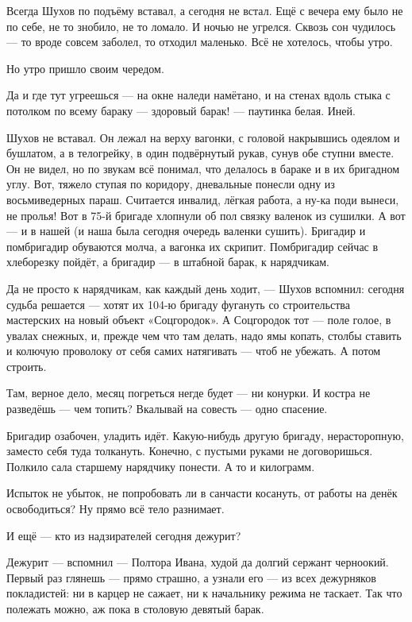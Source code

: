 Всегда Шухов по подъёму вставал, а сегодня не встал. Ещё с вечера ему было не по себе, не то
знобило, не то ломало. И ночью не угрелся. Сквозь сон чудилось --- то вроде совсем заболел, то
отходил маленько. Всё не хотелось, чтобы утро.

Но утро пришло своим чередом.

Да и где тут угреешься --- на окне наледи намётано, и на стенах вдоль стыка с потолком по всему
бараку --- здоровый барак! --- паутинка белая. Иней.

Шухов не вставал. Он лежал на верху вагонки, с головой накрывшись одеялом и бушлатом, а в
телогрейку, в один подвёрнутый рукав, сунув обе ступни вместе. Он не видел, но по звукам всё
понимал, что делалось в бараке и в их бригадном углу. Вот, тяжело ступая по коридору,
дневальные понесли одну из восьмиведерных параш. Считается инвалид, лёгкая работа, а ну-ка
поди вынеси, не пролья! Вот в 75-й бригаде хлопнули об пол связку валенок из сушилки. А вот --- и
в нашей (и наша была сегодня очередь валенки сушить). Бригадир и помбригадир обуваются молча,
а вагонка их скрипит. Помбригадир сейчас в хлеборезку пойдёт, а бригадир --- в штабной барак, к
нарядчикам.

Да не просто к нарядчикам, как каждый день ходит, --- Шухов вспомнил: сегодня судьба решается
--- хотят их 104-ю бригаду фугануть со строительства мастерских на новый объект «Соцгородок». А
Соцгородок тот --- поле голое, в увалах снежных, и, прежде чем что там делать, надо ямы копать,
столбы ставить и колючую проволоку от себя самих натягивать --- чтоб не убежать. А потом
строить.

Там, верное дело, месяц погреться негде будет --- ни конурки. И костра не разведёшь --- чем
топить? Вкалывай на совесть --- одно спасение.

Бригадир озабочен, уладить идёт. Какую-нибудь другую бригаду, нерасторопную, заместо себя
туда толкануть. Конечно, с пустыми руками не договоришься. Полкило сала старшему нарядчику
понести. А то и килограмм.

Испыток не убыток, не попробовать ли в санчасти косануть, от работы на денёк освободиться? Ну
прямо всё тело разнимает.

И ещё --- кто из надзирателей сегодня дежурит?

Дежурит --- вспомнил --- Полтора Ивана, худой да долгий сержант черноокий. Первый раз глянешь ---
прямо страшно, а узнали его --- из всех дежурняков покладистей: ни в карцер не сажает, ни к
начальнику режима не таскает. Так что полежать можно, аж пока в столовую девятый барак.

